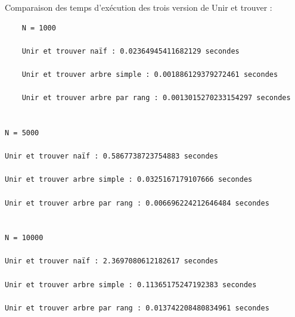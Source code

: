 Comparaison des temps d'exécution des trois version de Unir et trouver : 



\begin{verbatim}
    N = 1000
    
    Unir et trouver naïf : 0.02364945411682129 secondes 
    
    Unir et trouver arbre simple : 0.001886129379272461 secondes 
    
    Unir et trouver arbre par rang : 0.0013015270233154297 secondes 
    

N = 5000

Unir et trouver naïf : 0.5867738723754883 secondes 

Unir et trouver arbre simple : 0.0325167179107666 secondes 

Unir et trouver arbre par rang : 0.006696224212646484 secondes 


N = 10000

Unir et trouver naïf : 2.3697080612182617 secondes 

Unir et trouver arbre simple : 0.11365175247192383 secondes 

Unir et trouver arbre par rang : 0.013742208480834961 secondes 

\end{verbatim}
